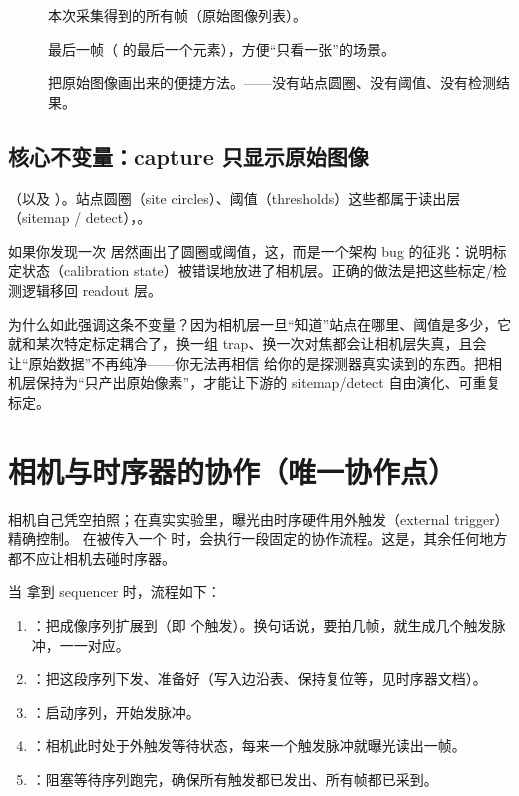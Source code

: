\documentclass[11pt,oneside,openany]{book}
\begin{document}
\begin{description}
\item[] 本次采集得到的所有帧（原始图像列表）。
\item[] 最后一帧（ 的最后一个元素），方便“只看一张”的场景。
\item[] 把原始图像画出来的便捷方法。——没有站点圆圈、没有阈值、没有检测结果。
\end{description}

\subsection{核心不变量：capture 只显示原始图像}

\begin{notebox}[最重要的一条边界]
（以及 ）。站点圆圈（site circles）、阈值（thresholds）这些都属于读出层（sitemap / detect），。

如果你发现一次  居然画出了圆圈或阈值，这，而是一个架构 bug 的征兆：说明标定状态（calibration state）被错误地放进了相机层。正确的做法是把这些标定/检测逻辑移回 readout 层。
\end{notebox}

为什么如此强调这条不变量？因为相机层一旦“知道”站点在哪里、阈值是多少，它就和某次特定标定耦合了，换一组 trap、换一次对焦都会让相机层失真，且会让“原始数据”不再纯净——你无法再相信  给你的是探测器真实读到的东西。把相机层保持为“只产出原始像素”，才能让下游的 sitemap/detect 自由演化、可重复标定。

\section{相机与时序器的协作（唯一协作点）}

相机自己凭空拍照；在真实实验里，曝光由时序硬件用外触发（external trigger）精确控制。 在被传入一个  时，会执行一段固定的协作流程。这是，其余任何地方都不应让相机去碰时序器。

当  拿到 sequencer 时，流程如下：

\begin{enumerate}
\item {}：把成像序列扩展到（即  个触发）。换句话说，要拍几帧，就生成几个触发脉冲，一一对应。
\item {}：把这段序列下发、准备好（写入边沿表、保持复位等，见时序器文档）。
\item {}：启动序列，开始发脉冲。
\item {}：相机此时处于外触发等待状态，每来一个触发脉冲就曝光读出一帧。
\item {}：阻塞等待序列跑完，确保所有触发都已发出、所有帧都已采到。
\end{enumerate}
\end{document}
